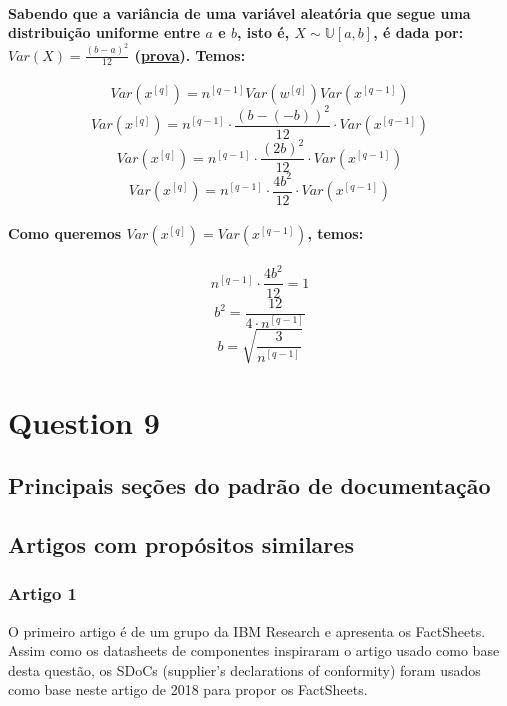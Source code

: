 \documentclass[a4paper]{article}    %
\begin{document}
\paragraph{Sabendo que a variância de uma variável aleatória que segue uma distribuição uniforme entre $a$ e $b$, isto é, $X \sim \mathbb{U}[a,b]$, é dada por: $Var(X) = \frac{(b-a)^2}{12}$ (\href{https://proofwiki.org/wiki/Variance_of_Continuous_Uniform_Distribution}{prova}). Temos:}
\[Var(x^{[q]}) = n^{[q-1]} Var(w^{[q]})Var(x^{[q-1]})\]
\[Var(x^{[q]}) = n^{[q-1]} \cdot \frac{(b-(-b))^2}{12} \cdot Var(x^{[q-1]})\]
\[Var(x^{[q]}) = n^{[q-1]} \cdot \frac{(2b)^2}{12} \cdot Var(x^{[q-1]})\]
\[Var(x^{[q]}) = n^{[q-1]} \cdot \frac{4b^2}{12} \cdot Var(x^{[q-1]})\]

\paragraph{Como queremos $Var(x^{[q]}) = Var(x^{[q-1]})$, temos:}
\[n^{[q-1]} \cdot \frac{4b^2}{12} = 1\]
\[b^2 = \frac{12}{4 \cdot n^{[q-1]}}\]
\[\boxed{b = \sqrt{\frac{3}{n^{[q-1]}}}}\]

\newpage
\setcounter{section}{9}
\setcounter{subsection}{0}
\section*{Question 9}

\subsection{Principais seções do padrão de documentação}


\subsection{Artigos com propósitos similares}

\subsubsection{Artigo 1}
O primeiro artigo é de um grupo da IBM Research e apresenta os FactSheets. Assim como os datasheets de componentes inspiraram o artigo usado como base desta questão, os SDoCs (supplier’s declarations of conformity) foram usados como base neste artigo de 2018 para propor os FactSheets.
\end{document}
